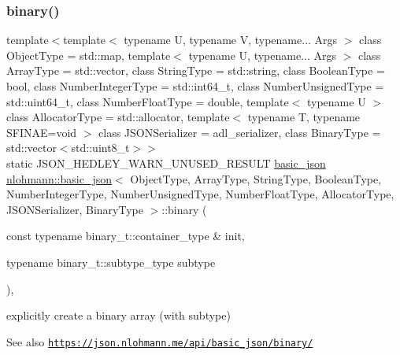 \subsubsection{\texorpdfstring{binary()}{binary()}\hspace{0.1cm}{\footnotesize\ttfamily [2/4]}}
{\footnotesize\ttfamily template$<$template$<$ typename U, typename V, typename... Args $>$ class Object\+Type = std\+::map, template$<$ typename U, typename... Args $>$ class Array\+Type = std\+::vector, class String\+Type  = std\+::string, class Boolean\+Type  = bool, class Number\+Integer\+Type  = std\+::int64\+\_\+t, class Number\+Unsigned\+Type  = std\+::uint64\+\_\+t, class Number\+Float\+Type  = double, template$<$ typename U $>$ class Allocator\+Type = std\+::allocator, template$<$ typename T, typename S\+F\+I\+N\+A\+E=void $>$ class J\+S\+O\+N\+Serializer = adl\+\_\+serializer, class Binary\+Type  = std\+::vector$<$std\+::uint8\+\_\+t$>$$>$ \\
static J\+S\+O\+N\+\_\+\+H\+E\+D\+L\+E\+Y\+\_\+\+W\+A\+R\+N\+\_\+\+U\+N\+U\+S\+E\+D\+\_\+\+R\+E\+S\+U\+LT \hyperlink{classnlohmann_1_1basic__json}{basic\+\_\+json} \hyperlink{classnlohmann_1_1basic__json}{nlohmann\+::basic\+\_\+json}$<$ Object\+Type, Array\+Type, String\+Type, Boolean\+Type, Number\+Integer\+Type, Number\+Unsigned\+Type, Number\+Float\+Type, Allocator\+Type, J\+S\+O\+N\+Serializer, Binary\+Type $>$\+::binary (\begin{DoxyParamCaption}\item[{const typename binary\+\_\+t\+::container\+\_\+type \&}]{init,  }\item[{typename binary\+\_\+t\+::subtype\+\_\+type}]{subtype }\end{DoxyParamCaption})\hspace{0.3cm}{\ttfamily [inline]}, {\ttfamily [static]}}



explicitly create a binary array (with subtype) 

\begin{DoxySeeAlso}{See also}
\href{https://json.nlohmann.me/api/basic_json/binary/}{\tt https\+://json.\+nlohmann.\+me/api/basic\+\_\+json/binary/} 
\end{DoxySeeAlso}
\mbox{\label{classnlohmann_1_1basic__json_ab085777bbfbfac5a472120b991ef5cf3}} 
